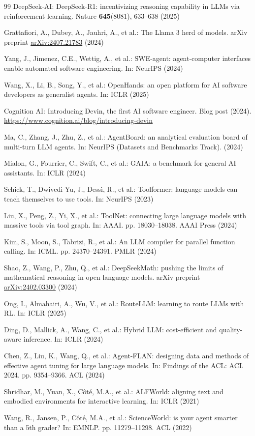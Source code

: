 \documentclass[runningheads]{llncs}
\begin{document}
\begin{thebibliography}{99}
DeepSeek-AI: DeepSeek-R1: incentivizing reasoning capability in LLMs via reinforcement learning. Nature \textbf{645}(8081), 633--638 (2025)

Grattafiori, A., Dubey, A., Jauhri, A., et al.: The Llama 3 herd of models. arXiv preprint \href{https://arxiv.org/abs/2407.21783}{arXiv:2407.21783} (2024)

Yang, J., Jimenez, C.E., Wettig, A., et al.: SWE-agent: agent-computer interfaces enable automated software engineering. In: NeurIPS (2024)

Wang, X., Li, B., Song, Y., et al.: OpenHands: an open platform for AI software developers as generalist agents. In:  ICLR (2025)

Cognition AI: Introducing Devin, the first AI software engineer. Blog post (2024). \url{https://www.cognition.ai/blog/introducing-devin}

Ma, C., Zhang, J., Zhu, Z., et al.: AgentBoard: an analytical evaluation board of multi-turn LLM agents. In: NeurIPS (Datasets and Benchmarks Track). (2024)

Mialon, G., Fourrier, C., Swift, C., et al.: GAIA: a benchmark for general AI assistants. In:  ICLR (2024)

Schick, T., Dwivedi-Yu, J., Dessì, R., et al.: Toolformer: language models can teach themselves to use tools. In: NeurIPS (2023)

Liu, X., Peng, Z., Yi, X., et al.: ToolNet: connecting large language models with massive tools via tool graph. In: AAAI. pp. 18030--18038. AAAI Press (2024)

Kim, S., Moon, S., Tabrizi, R., et al.: An LLM compiler for parallel function calling. In: ICML. pp. 24370--24391. PMLR (2024)

Shao, Z., Wang, P., Zhu, Q., et al.: DeepSeekMath: pushing the limits of mathematical reasoning in open language models. arXiv preprint \href{https://arxiv.org/abs/2402.03300}{arXiv:2402.03300} (2024)

Ong, I., Almahairi, A., Wu, V., et al.: RouteLLM: learning to route LLMs with RL. In:  ICLR (2025)

Ding, D., Mallick, A., Wang, C., et al.: Hybrid LLM: cost-efficient and quality-aware inference. In:  ICLR (2024)

Chen, Z., Liu, K., Wang, Q., et al.: Agent-FLAN: designing data and methods of effective agent tuning for large language models. In: Findings of the ACL: ACL 2024. pp. 9354--9366. ACL (2024)

Shridhar, M., Yuan, X., Côté, M.A., et al.: ALFWorld: aligning text and embodied environments for interactive learning. In:  ICLR (2021)

Wang, R., Jansen, P., Côté, M.A., et al.: ScienceWorld: is your agent smarter than a 5th grader? In: EMNLP. pp. 11279--11298. ACL (2022)

\end{thebibliography}
\clearpage
\appendix
\end{document}
